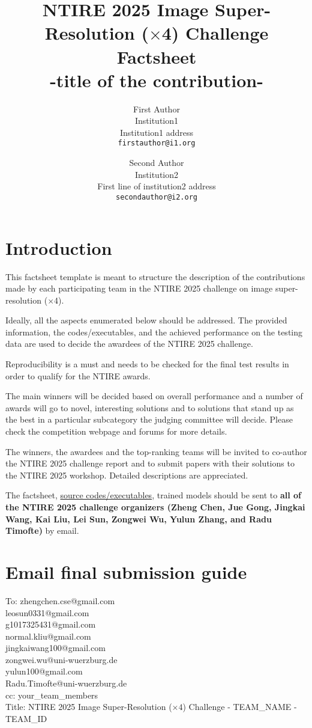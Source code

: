 \documentclass[10pt,twocolumn,letterpaper]{article}
\title{NTIRE 2025 Image Super-Resolution ($\times$4) Challenge Factsheet\\-title of the contribution-}
\author{First Author\\
Institution1\\
Institution1 address\\
{\tt\small firstauthor@i1.org}
\and
Second Author\\
Institution2\\
First line of institution2 address\\
{\tt\small secondauthor@i2.org}
}
\begin{document}
\maketitle

\section{Introduction}

This factsheet template is meant to structure the description of the contributions made by each participating team in the NTIRE 2025 challenge on image super-resolution ($\times$4). 

Ideally, all the aspects enumerated below should be addressed.
The provided information, the codes/executables, and the achieved performance on the testing data are used to decide the awardees of the NTIRE 2025 challenge. 

Reproducibility is a must and needs to be checked for the final test results in order to qualify for the NTIRE awards. 

The main winners will be decided based on overall performance and a number of awards will go to novel, interesting solutions and to solutions that stand up as the best in a particular subcategory the judging committee will decide. Please check the competition webpage and forums for more details.

The winners, the awardees and the top-ranking teams will be invited to co-author the NTIRE 2025 challenge report and to submit papers with their solutions to the NTIRE 2025 workshop. Detailed descriptions are appreciated.

The factsheet, \href{https://github.com/zhengchen1999/NTIRE2025_ImageSR_x4}{source codes/executables}, trained models should be sent to \textbf{all of the NTIRE 2025 challenge organizers (Zheng Chen, Jue Gong, Jingkai Wang, Kai Liu, Lei Sun, Zongwei Wu, Yulun Zhang, and Radu Timofte)} by email.

\section{Email final submission guide}

\noindent To: 
{zhengchen.cse@gmail.com}\\ 
{leosun0331@gmail.com} \\ 
{g1017325431@gmail.com}\\ 
{normal.kliu@gmail.com}\\ 
{jingkaiwang100@gmail.com}\\ 
{zongwei.wu@uni-wuerzburg.de}\\ 
{yulun100@gmail.com}\\ 
{Radu.Timofte@uni-wuerzburg.de}\\
\noindent cc: your\_team\_members\\
Title: NTIRE 2025 Image Super-Resolution ($\times4$) Challenge - TEAM\_NAME - TEAM\_ID\\
\end{document}

